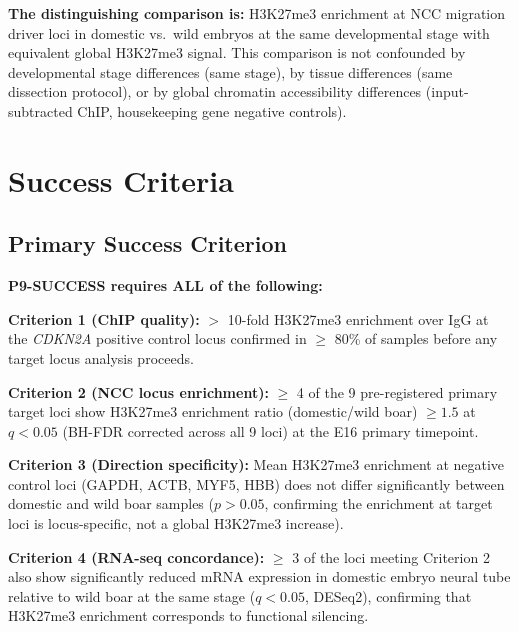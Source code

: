 \documentclass[10pt, a4paper]{article}
\begin{document}
\vspace{0.3em}
\textbf{The distinguishing comparison is:}
H3K27me3 enrichment at NCC migration driver
loci in domestic vs.\ wild embryos at the
same developmental stage with equivalent
global H3K27me3 signal. This comparison
is not confounded by developmental stage
differences (same stage), by tissue
differences (same dissection protocol),
or by global chromatin accessibility
differences (input-subtracted ChIP,
housekeeping gene negative controls).

\section{Success Criteria}
\label{sec:success}

\subsection{Primary Success Criterion}

\begin{mdframed}[
  backgroundcolor=notebox,
  linecolor=headergreen,
  linewidth=1pt,
  innertopmargin=0.5em,
  innerbottommargin=0.5em,
  innerleftmargin=0.8em,
  innerrightmargin=0.8em
]
\textbf{P9-SUCCESS requires ALL of the
following:}

\medskip
\textbf{Criterion 1 (ChIP quality):}
$>$ 10-fold H3K27me3 enrichment over IgG
at the \textit{CDKN2A} positive control
locus confirmed in $\geq$ 80\% of samples
before any target locus analysis proceeds.

\medskip
\textbf{Criterion 2 (NCC locus enrichment):}
$\geq$ 4 of the 9 pre-registered primary
target loci show H3K27me3 enrichment ratio
(domestic/wild boar) $\geq 1.5$ at
$q < 0.05$ (BH-FDR corrected across all
9 loci) at the E16 primary timepoint.

\medskip
\textbf{Criterion 3 (Direction specificity):}
Mean H3K27me3 enrichment at negative
control loci (GAPDH, ACTB, MYF5, HBB)
does not differ significantly between
domestic and wild boar samples
($p > 0.05$, confirming the enrichment
at target loci is locus-specific, not
a global H3K27me3 increase).

\medskip
\textbf{Criterion 4 (RNA-seq concordance):}
$\geq$ 3 of the loci meeting Criterion 2
also show significantly reduced mRNA
expression in domestic embryo neural
tube relative to wild boar at the same
stage ($q < 0.05$, DESeq2),
confirming that H3K27me3 enrichment
corresponds to functional silencing.
\end{mdframed}
\end{document}
